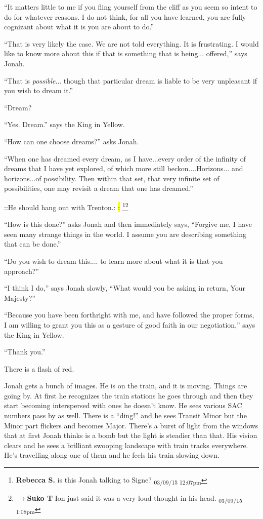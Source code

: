 ``It matters little to me if you fling yourself from the cliff as you seem so intent to do for whatever reasons.  I do not think, for all you have learned, you are fully cognizant about what it is you are about to do.''

``That is very likely the case.  We are not told everything.  It is frustrating.  I would like to know more about this if that is something that is being... offered,'' says Jonah.

``That is \textit{possible}... though that particular dream is liable to be very unpleasant if you wish to dream it.''

``Dream?

``Yes. Dream.'' says the King in Yellow.

``How can one choose dreams?'' asks Jonah.

``When one has dreamed every dream, as I have...every order of the infinity of dreams that I have yet explored, of which more still beckon....Horizons... and horizons...of possibility.  Then within that set, that very infinite set of possibilities, one may revisit a dream that one has dreamed.''

 {\color[RGB]{221,126,107}::He should hang out with Trenton.:}  {\color[RGB]{221,126,107}\hl{:}} \footnote{\textbf{Rebecca S. }is this Jonah talking to Signe? \textsubscript{03/09/15 12:07pm}}\footnote{$\rightarrow$\textbf{Suko T }Ion just said it was a very loud thought in his head. \textsubscript{03/09/15 1:08pm}}

``How is this done?'' asks Jonah and then immediately says, ``Forgive me, I have seen many strange things in the world.  I assume you are describing something that can be done.''

``Do you wish to dream this.... to learn more about what it is that you approach?''

``I think I do,'' says Jonah slowly,  ``What would you be asking in return, Your Majesty?''

``Because you have been forthright with me, and have followed the proper forms, I am willing to grant you this as a gesture of good faith in our negotiation,'' says the King in Yellow.

``Thank you.''



There is a flash of red.



Jonah gets a bunch of images.  He is on the train, and it is moving.  Things are going by.  At first he recognizes the train stations he goes through and then they start becoming interspersed with ones he doesn't know.   He sees various SAC numbers pass by as well.  There is a ``ding!'' and he sees Transit Minor but the Minor part flickers and becomes Major.  There's a burst of light from the windows that at first Jonah thinks is a bomb but the light is steadier than that.  His vision clears and he sees a brilliant swooping landscape with train tracks everywhere.  He's travelling along one of them and he feels his train slowing down.



